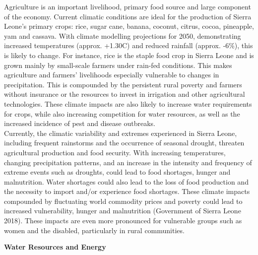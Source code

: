 \documentclass[
]{book}
\begin{document}
Agriculture is an important livelihood, primary food source and large component of the economy. Current climatic conditions are ideal for the production of Sierra Leone's primary crops: rice, sugar cane, banana, coconut, citrus, cocoa, pineapple, yam and cassava. With climate modelling projections for 2050, demonstrating increased temperatures (approx. +1.30C) and reduced rainfall (approx. ‐6\%), this is likely to change. For instance, rice is the staple food crop in Sierra Leone and is grown mainly by small-scale farmers under rain-fed conditions. This makes agriculture and farmers' livelihoods especially vulnerable to changes in precipitation. This is compounded by the persistent rural poverty and farmers without insurance or the resources to invest in irrigation and other agricultural technologies. These climate impacts are also likely to increase water requirements for crops, while also increasing competition for water resources, as well as the increased incidence of pest and disease outbreaks.\\
Currently, the climatic variability and extremes experienced in Sierra Leone, including frequent rainstorms and the occurrence of seasonal drought, threaten agricultural production and food security. With increasing temperatures, changing precipitation patterns, and an increase in the intensity and frequency of extreme events such as droughts, could lead to food shortages, hunger and malnutrition. Water shortages could also lead to the loss of food production and the necessity to import and/or experience food shortages. These climate impacts compounded by fluctuating world commodity prices and poverty could lead to increased vulnerability, hunger and malnutrition (Government of Sierra Leone 2018). These impacts are even more pronounced for vulnerable groups such as women and the disabled, particularly in rural communities.

\textbf{Water Resources and Energy}
\end{document}
